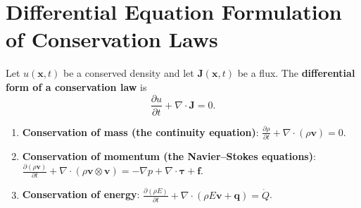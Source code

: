 \section{Differential Equation Formulation of Conservation Laws}\label{sec:conservation_laws_pde}

\begin{definition}\label{def:conservation_law_differential}
Let $u(\mathbf{x}, t)$ be a conserved density and let $\mathbf{J}(\mathbf{x}, t)$ be a flux. The \textbf{differential form of a conservation law} is
\[
\frac{\partial u}{\partial t} + \nabla \cdot \mathbf{J} = 0.
\]
\end{definition}

\begin{example}\label{ex:three_conservation_laws}
\begin{enumerate}[label=(\roman*)]
    \item \textbf{Conservation of mass (the continuity equation)}: $\frac{\partial \rho}{\partial t} + \nabla \cdot (\rho \mathbf{v}) = 0$.
    \item \textbf{Conservation of momentum (the Navier--Stokes equations)}: $\frac{\partial (\rho \mathbf{v})}{\partial t} + \nabla \cdot (\rho \mathbf{v} \otimes \mathbf{v}) = -\nabla p + \nabla \cdot \boldsymbol{\tau} + \mathbf{f}$.
    \item \textbf{Conservation of energy}: $\frac{\partial (\rho E)}{\partial t} + \nabla \cdot (\rho E \mathbf{v} + \mathbf{q}) = \dot{Q}$.
\end{enumerate}
\end{example}

